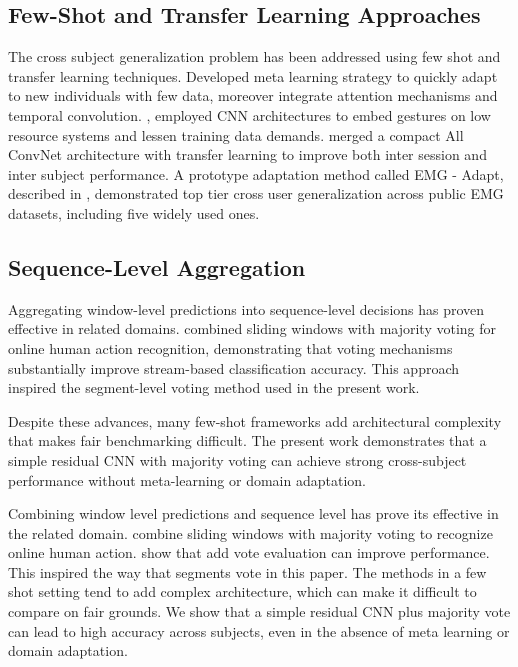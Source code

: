 \documentclass[article,submit,pdftex,moreauthors]{Definitions/mdpi}
\begin{document}
\subsection{Few-Shot and Transfer Learning Approaches}

The cross subject generalization problem has been addressed using few shot and transfer learning techniques. \cite{rahimian2021fs} Developed meta learning strategy to quickly adapt to new individuals with few data, moreover \citep{Rahimian2021trustworthy} integrate attention mechanisms and temporal convolution. \cite{Tam2022siamese}, employed CNN architectures to embed gestures on low resource systems and lessen training data demands. \cite{islam2024surface} merged a compact All ConvNet architecture with transfer learning to improve both inter session and inter subject performance. A prototype adaptation method called EMG - Adapt, described in \cite{lee2026few}, demonstrated top tier cross user generalization across public EMG datasets, including five widely used ones.

\subsection{Sequence-Level Aggregation}

Aggregating window-level predictions into sequence-level decisions has proven effective in related domains. \cite{dallel2022sliding} combined sliding windows with majority voting for online human action recognition, demonstrating that voting mechanisms substantially improve stream-based classification accuracy. This approach inspired the segment-level voting method used in the present work.

Despite these advances, many few-shot frameworks add architectural complexity that makes fair benchmarking difficult. The present work demonstrates that a simple residual CNN with majority voting can achieve strong cross-subject performance without meta-learning or domain adaptation.

Combining window level predictions and sequence level has prove its effective in the related domain. \cite{dallel2022sliding} combine sliding windows with majority voting to recognize online human action. show that add vote evaluation can improve performance. This inspired the way that segments vote in this paper. The methods in a few shot setting tend to add complex architecture, which can make it difficult to compare on fair grounds. We show that a simple residual CNN plus majority vote can lead to high accuracy across subjects, even in the absence of meta learning or domain adaptation. 
\end{document}
